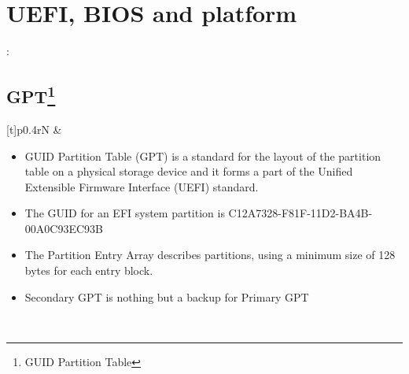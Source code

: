 \chapter{UEFI, BIOS and platform}
\begin{note}[Abbreviations]:\\
	
\end{note}
\section[GPT]{GPT\protect\footnote{GUID Partition Table}}
\begin{tabularx}{\textwidth}[t]{p{}rN}
 &  \\ 
 \begin{itemize}
 	\item GUID Partition Table (GPT) is a standard for the layout of the partition table on a physical storage device and it forms a part of the Unified Extensible Firmware Interface (UEFI) standard.
 	\item The GUID for an EFI system partition is C12A7328-F81F-11D2-BA4B-00A0C93EC93B
 	\item The Partition Entry Array describes partitions, using a minimum size of 128 bytes for each entry block.
 	\item Secondary GPT is nothing but a backup for Primary GPT
 \end{itemize} \\ [11cm]
\end{tabularx}


